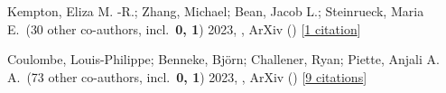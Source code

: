 \item[{\color{numcolor}\scriptsize2}] Kempton, Eliza M. -R.; Zhang, Michael; Bean, Jacob L.; Steinrueck, Maria E.\etal\ ({30} other co-authors, incl.\ \textbf{{0}, {1}}) 2023, , ArXiv () [\href{https://ui.adsabs.harvard.edu/abs/2023arXiv230506240K}{1 citation}]

\item[{\color{numcolor}\scriptsize1}] Coulombe, Louis-Philippe; Benneke, Bj{\"o}rn; Challener, Ryan; Piette, Anjali A. A.\etal\ ({73} other co-authors, incl.\ \textbf{{0}, {1}}) 2023, , ArXiv () [\href{https://ui.adsabs.harvard.edu/abs/2023arXiv230108192C}{9 citations}]